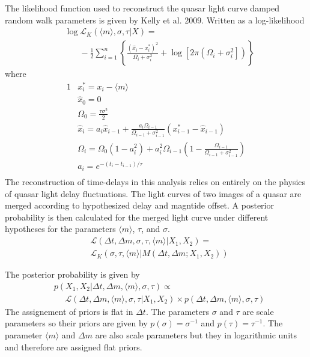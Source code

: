 \documentclass{emulateapj}
\begin{document}
The likelihood function used to reconstruct the quasar light curve damped random walk parameters is given by Kelly et al. 2009. Written as a log-likelihood
\begin{align} 
& \log\mathcal{L}_{K}(\langle m\rangle, \sigma,\tau | X) = \nonumber \\
& \ \ \ \ \ \ \ \ -\frac{1}{2}\sum_{i=1}^{n}\left\{
\frac{\left(\hat{x}_i-x^{*}_i\right)^2}{\Omega_i+\sigma_i^2} 
+ 
\log\left[2\pi\left(\Omega_i+\sigma_i^2\right]\right)
\right\}
\end{align}
where 
\begin{alignat}{1}
& x_{i}^{*} = x_i-\langle m \rangle \\
& \hat{x}_0 = 0   \\
& \Omega_{0}=\frac{\tau\sigma^2}{2} \\
& \hat{x}_i = a_i\hat{x}_{i-1} + \frac{a_i\Omega_{i-1}}{\Omega_{i-1}+\sigma^2_{i-1}} \left(x^{*}_{i-1}-\hat{x}_{i-1}\right) \\
& \Omega_{i}=\Omega_{0}\left(1-a_{i}^2\right) + a_{i}^2\Omega_{i-1}\left(1-\frac{\Omega_{i-1}}{\Omega_{i-1}+\sigma_{i-1}^2}\right) \\
& a_i = e^{-\left(t_i-t_{i-1}\right)/\tau} \\
\end{alignat}
The reconstruction of time-delays in this analysis relies on entirely on the physics of quasar light delay fluctuations. The light curves of two images of a quasar are merged according to hypothesized delay and magntide offset. A posterior probability is then calculated for the merged light curve under different hypotheses for the parameters $\langle m\rangle$, $\tau$, and $\sigma$.
\begin{align}
& \mathcal L (\Delta t, \Delta m, \sigma, \tau, \langle m \rangle | X_1, X_2)  = \nonumber \\
& \mathcal{L}_{K} \left( \sigma, \tau, \langle m \rangle  | M(\Delta t,\Delta m ; X_1, X_2) \right)
\end{align}

The posterior probability is given by
\begin{align}
& p(X_1, X_2 | \Delta t, \Delta m, \langle m \rangle, \sigma,\tau) \propto \nonumber \\
&  \ \ \ \ \ \ \mathcal{L}(\Delta t, \Delta m, \langle m \rangle, \sigma,\tau | X_1, X_2)\times p(\Delta t, \Delta m, \langle m \rangle, \sigma,\tau)
\end{align}
The assignement of priors is flat in $\Delta t$. The parameters $\sigma$ and $\tau$ are scale parameters so their priors are given by $p(\sigma)=\sigma^{-1}$ and $p(\tau)=\tau^{-1}$. The parameter $\langle m \rangle$ and $\Delta m$ are also scale parameters but they in logarithmic units and therefore are assigned flat priors.
\end{document}
